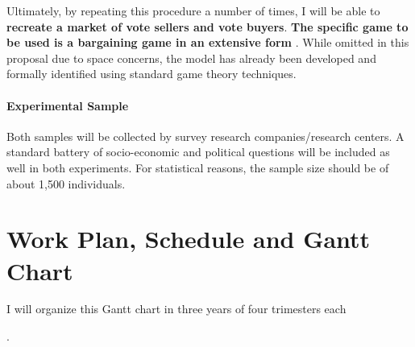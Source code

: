 \documentclass[onesided]{article}\usepackage[]{graphicx}\usepackage[]{color}
\begin{document}
Ultimately, by repeating this procedure a number of times, I will be able to {\bf recreate a market of vote sellers and vote buyers}. {\bf The specific game to be used is a bargaining game in an extensive form} \parencite{Watson:2007fk}. While omitted in this proposal due to space concerns, the model has already been developed and formally identified using standard game theory techniques.


\paragraph{Experimental Sample} Both samples will be collected by survey research companies/research centers. A standard battery of socio-economic and political questions will be included as well in both experiments. For statistical reasons, the sample size should be of about 1,500 individuals.


\clearpage

\newpage
\section{Work Plan, Schedule and Gantt Chart}

\hypertarget{timing}{I will organize this Gantt chart in three years of four trimesters each}.
\end{document}
